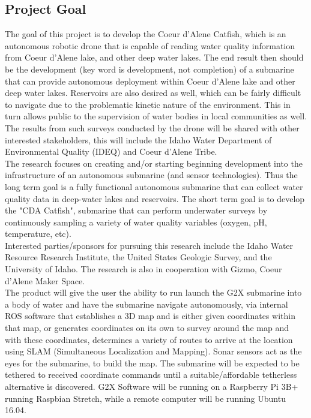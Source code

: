 \documentclass[12pt]{article}
\begin{document}
		\subsection{Project Goal}
		The goal of this project is to develop the Coeur d'Alene Catfish, which is an autonomous robotic drone that is capable of reading water quality information from Coeur d'Alene lake, and other deep water lakes. The end result then should be the development (key word is development, not completion) of a submarine that can provide autonomous deployment within Coeur d'Alene lake and other deep water lakes. Reservoirs are also desired as well, which can be fairly difficult to navigate due to the problematic kinetic nature of the environment. This in turn allows public to the supervision of water bodies in local communities as well. The results from such surveys conducted by the drone will be shared with other interested stakeholders, this will include the Idaho Water Department of Environmental Quality (IDEQ) and Coeur d'Alene Tribe.\\
		The research focuses on creating and/or starting beginning development into the infrastructure of an autonomous submarine (and sensor technologies). Thus the long term goal is a fully functional autonomous submarine that can collect water quality data in deep-water lakes and reservoirs. The short term goal is to develop the "CDA Catfish", submarine that can perform underwater surveys by continuously sampling a variety of water quality variables (oxygen, pH, temperature, etc).\\
		Interested parties/sponsors for pursuing this research include the Idaho Water Resource Research Institute, the United States Geologic Survey, and the University of Idaho. The research is also in cooperation with Gizmo, Coeur d'Alene Maker Space.\\
		
		The product will give the user the ability to run launch the G2X submarine into a body of water and have the submarine navigate autonomously, via internal ROS software that establishes a 3D map and is either given coordinates within that map, or generates coordinates on its own to survey around the map and with these coordinates, determines a variety of routes to arrive at the location using SLAM (Simultaneous Localization and Mapping). Sonar sensors act as the eyes for the submarine, to build the map. The submarine will be expected to be tethered to received coordinate commands until a suitable/affordable tetherless alternative is discovered. G2X Software will be running on a Raspberry Pi 3B+ running Raspbian Stretch, while a remote computer will be running Ubuntu 16.04.
		
\end{document}
